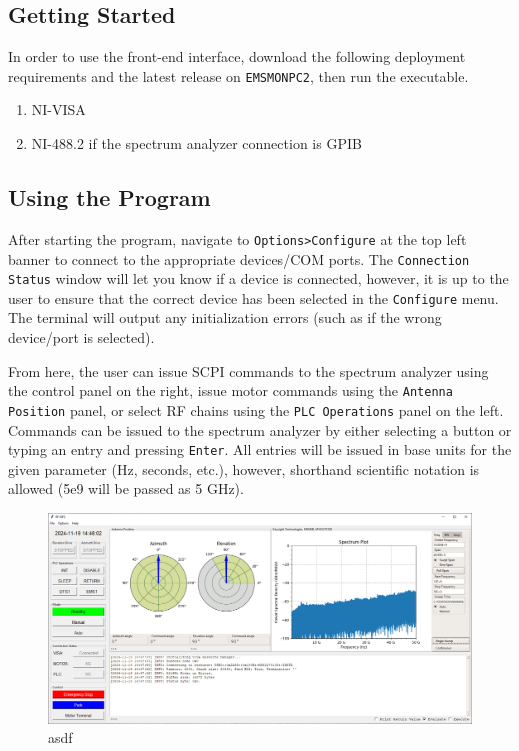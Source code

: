 \documentclass[titlepage]{article}
\begin{document}
\subsection{Getting Started}
In order to use the front-end interface, download the following deployment requirements and the latest release on \verb|EMSMONPC2|, then run the executable.
\begin{enumerate}
  \item NI-VISA
  \item NI-488.2 if the spectrum analyzer connection is GPIB
\end{enumerate}

\subsection{Using the Program}\label{sec:usingtheprogram}
After starting the program, navigate to \verb|Options>Configure| at the top left banner to connect to the appropriate devices/COM ports. The \verb|Connection Status| window will let you know if a device is connected, however, it is up to the user to ensure that the correct device has been selected in the \verb|Configure| menu. The terminal will output any initialization errors (such as if the wrong device/port is selected).

From here, the user can issue SCPI commands to the spectrum analyzer using the control panel on the right, issue motor commands using the \verb|Antenna Position| panel, or select RF chains using the \verb|PLC Operations| panel on the left. Commands can be issued to the spectrum analyzer by either selecting a button or typing an entry and pressing \verb|Enter|. All entries will be issued in base units for the given parameter (Hz, seconds, etc.), however, shorthand scientific notation is allowed (5e9 will be passed as 5 GHz).

\begin{figure}
  \begin{center}
    \includegraphics[width=\textwidth]{images/3gui.png}
  \end{center}
  \caption{asdf}\label{fig:gui}
\end{figure}
\end{document}

